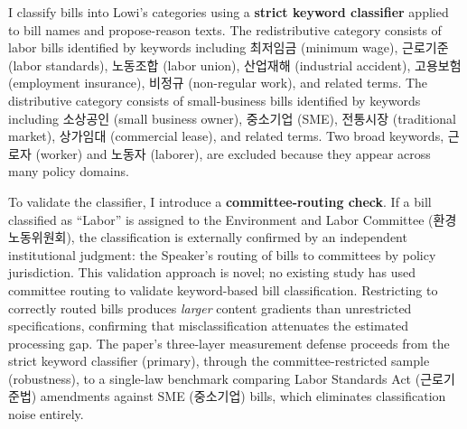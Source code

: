 \documentclass[11pt]{article}
\begin{document}
I classify bills into Lowi's categories using a \textbf{strict keyword classifier} applied to bill names and propose-reason texts. The redistributive category consists of labor bills identified by keywords including 최저임금 (minimum wage), 근로기준 (labor standards), 노동조합 (labor union), 산업재해 (industrial accident), 고용보험 (employment insurance), 비정규 (non-regular work), and related terms. The distributive category consists of small-business bills identified by keywords including 소상공인 (small business owner), 중소기업 (SME), 전통시장 (traditional market), 상가임대 (commercial lease), and related terms. Two broad keywords, 근로자 (worker) and 노동자 (laborer), are excluded because they appear across many policy domains.

To validate the classifier, I introduce a \textbf{committee-routing check}. If a bill classified as ``Labor'' is assigned to the Environment and Labor Committee (환경노동위원회), the classification is externally confirmed by an independent institutional judgment: the Speaker's routing of bills to committees by policy jurisdiction. This validation approach is novel; no existing study has used committee routing to validate keyword-based bill classification. Restricting to correctly routed bills produces \emph{larger} content gradients than unrestricted specifications, confirming that misclassification attenuates the estimated processing gap. The paper's three-layer measurement defense proceeds from the strict keyword classifier (primary), through the committee-restricted sample (robustness), to a single-law benchmark comparing Labor Standards Act (근로기준법) amendments against SME (중소기업) bills, which eliminates classification noise entirely.
\end{document}
